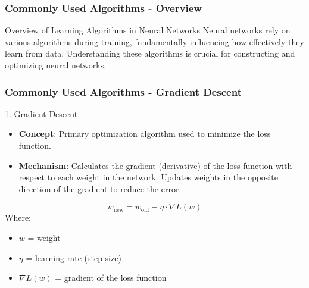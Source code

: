 \documentclass[aspectratio=169]{beamer}
\begin{document}
\begin{frame}[fragile]
    \frametitle{Commonly Used Algorithms - Overview}
    \begin{block}{Overview of Learning Algorithms in Neural Networks}
        Neural networks rely on various algorithms during training, fundamentally influencing how effectively they learn from data. 
        Understanding these algorithms is crucial for constructing and optimizing neural networks.
    \end{block}
\end{frame}

\begin{frame}[fragile]
    \frametitle{Commonly Used Algorithms - Gradient Descent}
    \begin{block}{1. Gradient Descent}
        \begin{itemize}
            \item \textbf{Concept}: Primary optimization algorithm used to minimize the loss function.
            \item \textbf{Mechanism}: Calculates the gradient (derivative) of the loss function with respect to each weight in the network. 
            Updates weights in the opposite direction of the gradient to reduce the error.
        \end{itemize}
        
        \begin{equation}
            w_{\text{new}} = w_{\text{old}} - \eta \cdot \nabla L(w)
        \end{equation}
        Where:
        \begin{itemize}
            \item $w$ = weight
            \item $\eta$ = learning rate (step size)
            \item $\nabla L(w)$ = gradient of the loss function
        \end{itemize}
    \end{block}
\end{frame}
\end{document}
